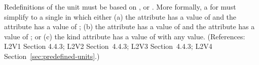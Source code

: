 Redefinitions of the  unit  must be
based on ,  or .  More
formally, a \UnitDefinition for  must simplify to a single
\Unit in which either (a) the  attribute has a value of
 and the  attribute has a value of ; (b)
the  attribute has a value of  and the
 attribute has a value of ; or (c) the kind
attribute has a value of  with any 
value.  (References: L2V1 Section 4.4.3; L2V2 Section~4.4.3; L2V3
Section~4.4.3; L2V4 Section~\ref{sec:predefined-units}.)
